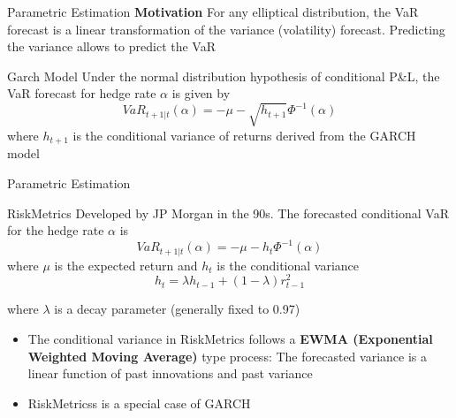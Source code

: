 \documentclass{beamer}
\newcommand{\imfbold}[1]{\textbf{\textcolor{imfblue}{#1}}}
\begin{document}
\begin{frame}{Parametric Estimation}
\imfbold{Motivation} For any elliptical distribution, the VaR forecast is a linear transformation of the variance (volatility) forecast. Predicting the variance allows to predict the VaR
\medskip

    \begin{block}{Garch Model}
        Under the normal distribution hypothesis of conditional P\&L, the VaR forecast for hedge rate $\alpha$ is given by 
        $$VaR_{t+1|t}(\alpha) = -\mu-\sqrt{h_{t+1}}\Phi^{-1}(\alpha)$$
        where $h_{t+1}$ is the conditional variance of returns derived from the GARCH model
    \end{block}    
\end{frame}

\begin{frame}{Parametric Estimation}
\begin{block}{RiskMetrics}
    Developed by JP Morgan in the 90s. The forecasted conditional VaR for the hedge rate $\alpha$ is
        $$VaR_{t+1|t}(\alpha) = -\mu-h_{t}\Phi^{-1}(\alpha)$$
    where $\mu$ is the expected return and $h_t$ is the conditional variance
    $$h_t = \lambda h_{t-1}+(1-\lambda)r^2_{t-1}$$
    
    where $\lambda$ is a decay parameter (generally fixed to 0.97)
    \end{block}
    \begin{itemize}
        \item The conditional variance in RiskMetrics follows a \textbf{EWMA (Exponential Weighted Moving Average)} type process: The forecasted variance is a linear function of past innovations and past variance
        \item RiskMetricss  is a special case of GARCH
    \end{itemize}
\end{frame}
\end{document}
